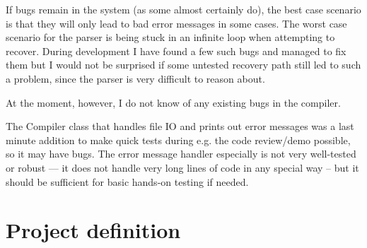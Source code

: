 \documentclass[a4paper,11pt]{article}
\begin{document}
If bugs remain in the system (as some almost certainly do), the best case scenario is that they will only lead to bad error messages in some cases. The worst case scenario for the parser is being stuck in an infinite loop when attempting to recover. During development I have found a few such bugs and managed to fix them but I would not be surprised if some untested recovery path still led to such a problem, since the parser is very difficult to reason about.

At the moment, however, I do not know of any existing bugs in the compiler.

The Compiler class that handles file IO and prints out error messages was a last minute addition to make quick tests during e.g. the code review/demo possible, so it may have bugs. The error message handler especially is not very well-tested or robust --- it does not handle very long lines of code in any special way -- but it should be sufficient for basic hands-on testing if needed.

\appendix
\section{Project definition}
\end{document}
